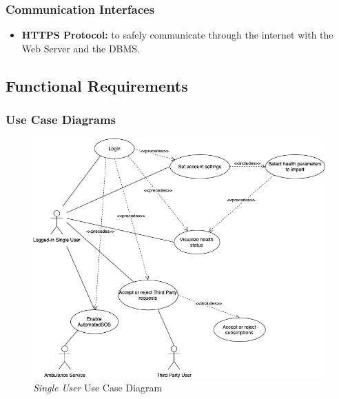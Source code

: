 \documentclass[titlepage]{article}
\begin{document}
		\subsubsection{Communication Interfaces}
		\begin{itemize}
			\item {\bf HTTPS Protocol:} to safely communicate through the internet with the Web Server and the DBMS.

		\end{itemize}

	\subsection{Functional Requirements}
			
		\subsubsection{Use Case Diagrams}
			
		\begin{figure}[H]
  			\includegraphics[width=\linewidth]{Diagrammi/SingleUserUseCase.png}
  			\caption{{\it Single User} Use Case Diagram}
 			 \label{fig:SingleUserUseCase}
		\end{figure}
			
\end{document}
